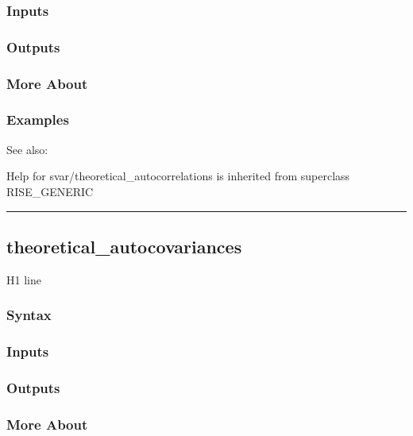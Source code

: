 \documentclass[letterpaper,10pt,english]{sphinxmanual}
\begin{document}
\subsubsection{Inputs}
\label{classes/models/@svar/svar:id135}

\subsubsection{Outputs}
\label{classes/models/@svar/svar:id136}

\subsubsection{More About}
\label{classes/models/@svar/svar:id137}

\subsubsection{Examples}
\label{classes/models/@svar/svar:id138}
See also:

Help for svar/theoretical\_autocorrelations is inherited from superclass RISE\_GENERIC


\bigskip\hrule{}\bigskip



\subsection{theoretical\_autocovariances}
\label{classes/models/@svar/svar:id139}\label{classes/models/@svar/svar:theoretical-autocovariances}
H1 line


\subsubsection{Syntax}
\label{classes/models/@svar/svar:id140}

\subsubsection{Inputs}
\label{classes/models/@svar/svar:id141}

\subsubsection{Outputs}
\label{classes/models/@svar/svar:id142}

\subsubsection{More About}
\label{classes/models/@svar/svar:id143}
\end{document}
